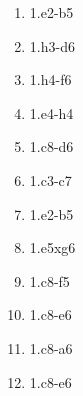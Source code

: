 \begin{enumerate}
\setcounter{enumi}{\value{d_counter}}
\item 1.\bishop{}e2-b5\mate{}
\item 1.\bishop{}h3-d6\mate{}
\item 1.\bishop{}h4-f6\mate{}
\item 1.\rook{}e4-h4\mate{}
\item 1.\knight{}c8-d6\mate{}
\item 1.\rook{}c3-c7\mate{}

\item 1.\bishop{}e2-b5\mate{}
\item 1.\knight{}e5xg6\mate{}
\item 1.\bishop{}c8-f5\mate{}
\item 1.\bishop{}c8-e6\mate{}
\item 1.\bishop{}c8-a6\mate{}
\item 1.\bishop{}c8-e6\mate{}
\setcounter{d_counter}{\value{enumi}}
\end{enumerate}